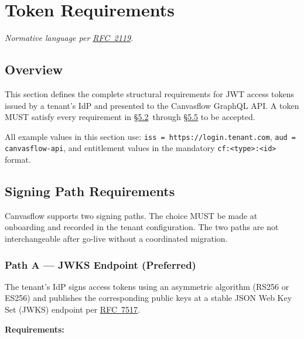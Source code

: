 
\section{Token Requirements}\label{sec:token-requirements}

\textit{Normative language per \href{https://tools.ietf.org/html/rfc2119}{RFC~2119}.}

\subsection{Overview}


This section defines the complete structural requirements for JWT access tokens issued
by a tenant's IdP and presented to the Canvasflow GraphQL API. A token MUST satisfy
every requirement in \hyperref[sec:signing-path-requirements]{\S5.2}\ through 
\hyperref[sec:prohibited]{\S5.5} to be accepted. 

All example values in this section use: \linebreak
\texttt{iss = https://login.tenant.com}, 
\texttt{aud = canvasflow-api}, and entitlement values in the mandatory
\texttt{cf:<type>:<id>} format.

\subsection{Signing Path Requirements}\label{sec:signing-path-requirements}

Canvasflow supports two signing paths. The choice MUST be made at onboarding and
recorded in the tenant configuration. The two paths are not interchangeable after go-live
without a coordinated migration.

\subsubsection{Path A --- JWKS Endpoint (Preferred)}\label{sec:jwks-endpoint}

The tenant's IdP signs access tokens using an asymmetric algorithm (RS256 or ES256) and
publishes the corresponding public keys at a stable JSON Web Key Set (JWKS) endpoint per
\href{https://datatracker.ietf.org/doc/html/rfc7517}{RFC~7517}.

\textbf{Requirements:}

